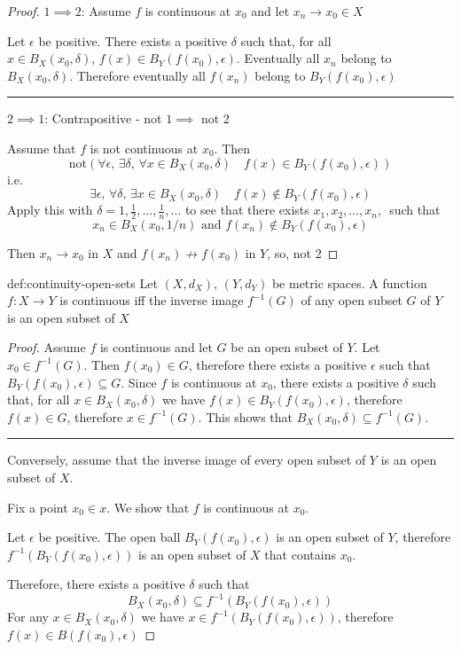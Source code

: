 \documentclass{article}
\begin{document}
\newpage
\begin{proof}
    $1 \implies 2$: Assume $f$ is continuous at $x_{0}$ and let $x_{n}\to x_{0}\in X$

Let $\epsilon$ be positive. There exists a positive $\delta$ such that, for all $x\in B_{X}(x_{0},\delta),\,f(x)\in B_{Y}(f(x_{0}), \epsilon)$. Eventually all $x_{n}$ belong to $B_{X}(x_{0}, \delta)$. Therefore eventually all $f(x_{n})$ belong to $B_{Y}(f(x_{0}), \epsilon)$
\noindent\rule{\textwidth}{0.2pt}
$2 \implies 1$: Contrapositive - not $1 \implies$ not 2

Assume that $f$ is not continuous at $x_{0}$. Then
\[\text{not}\left( \forall \epsilon,\,\exists \delta,\,\forall x\in B_{X}(x_{0}, \delta) \quad f(x)\in B_{Y}(f(x_{0}), \epsilon)\right)\]
i.e.
\[\exists \epsilon,\, \forall \delta,\, \exists x\in B_{X}(x_{0},\delta) \quad f(x)\not\in B_{Y}(f(x_{0}), \epsilon)\]
Apply this with $\delta = 1, \frac{1}{2},\dots,\frac{1}{n},\dots$ to see that there exists $x_{1},x_{2},\dots,x_{n},\,$ such that
\[x_{n}\in B_{X}(x_{0}, 1 /n) \text{ and } f(x_{n})\not\in B_{Y}(f(x_{0}), \epsilon)\]

Then $x_{n}\to x_{0}$ in $X$ and $f(x_{n})\not\to f(x_{0})$ in $Y$, so, not 2
\end{proof}

\begin{thm}{def:continuity-open-sets}{}
    Let $(X, d_{X}),\,(Y, d_{Y})$ be metric spaces. A function $f: X \to Y $ is continuous iff the inverse image $f^{-1}(G)$ of any open subset $G$ of $Y$ is an open subset of $X$
\end{thm}

\begin{proof}
    Assume $f$ is continuous and let $G$ be an open subset of $Y$. Let $x_{0}\in f^{-1}(G)$. Then $f(x_{0})\in G$, therefore there exists a positive $\epsilon$ such that $B_{Y}(f(x_{0}), \epsilon)\subseteq G$. Since $f$ is continuous at $x_{0}$, there exists a positive $\delta$ such that, for all $x\in B_{X}(x_{0}, \delta)$ we have $f(x)\in B_{Y}(f(x_{0}), \epsilon)$, therefore $f(x)\in G$, therefore $x\in f^{-1}(G)$. This shows that $B_{X}(x_{0}, \delta)\subseteq f^{-1}(G)$.

    \noindent\rule{\textwidth}{0.2pt}
    Conversely, assume that the inverse image of every open subset of $Y$ is an open subset of $X$.

    Fix a point $x_{0}\in x$. We show that $f$ is continuous at $x_{0}$.

    Let $\epsilon$ be positive. The open ball $B_{Y}(f(x_{0}), \epsilon)$ is an open subset of $Y$, therefore $f^{-1}(B_{Y}(f(x_{0}), \epsilon))$ is an open subset of $X$ that contains $x_{0}$.

    Therefore, there exists a positive $\delta$ such that
    \[B_{X}(x_{0}, \delta)\subseteq f^{-1}(B_{Y}(f(x_{0}), \epsilon))\]
    For any $x\in B_{X}(x_{0}, \delta)$ we have $x\in f^{-1}(B_{Y}(f(x_{0}), \epsilon))$, therefore $f(x)\in B(f(x_{0}), \epsilon)$
\end{proof}
\end{document}
